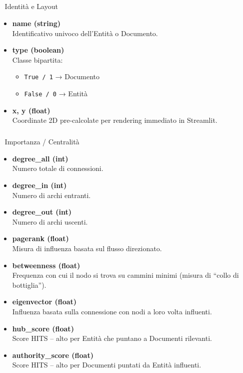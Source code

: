 \documentclass[
  italian,
  a4paper,
]{article}
\makeatletter
\let\oldsubparagraph\subparagraph
\renewcommand{\subparagraph}{
    \@ifstar
      \xxxSubParagraphStar
      \xxxSubParagraphNoStar
  }
\newcommand{\xxxSubParagraphStar}[1]{\oldsubparagraph*{#1}\mbox{}}
\newcommand{\xxxSubParagraphNoStar}[1]{\oldsubparagraph{#1}\mbox{}}
\providecommand{\tightlist}{%
  \setlength{\itemsep}{0pt}\setlength{\parskip}{0pt}}
\makeatother
\begin{document}
\subparagraph{🔹 Identità e Layout}\label{identituxe0-e-layout}

\begin{itemize}
\item
  \textbf{name (string)}\\
  Identificativo univoco dell'Entità o Documento.
\item
  \textbf{type (boolean)}\\
  Classe bipartita:

  \begin{itemize}
  \tightlist
  \item
    \texttt{True\ /\ 1} → Documento\\
  \item
    \texttt{False\ /\ 0} → Entità
  \end{itemize}
\item
  \textbf{x, y (float)}\\
  Coordinate 2D pre-calcolate per rendering immediato in Streamlit.
\end{itemize}

\subparagraph{🔹 Importanza /
Centralità}\label{importanza-centralituxe0}

\begin{itemize}
\item
  \textbf{degree\_all (int)}\\
  Numero totale di connessioni.
\item
  \textbf{degree\_in (int)}\\
  Numero di archi entranti.
\item
  \textbf{degree\_out (int)}\\
  Numero di archi uscenti.
\item
  \textbf{pagerank (float)}\\
  Misura di influenza basata sul flusso direzionato.
\item
  \textbf{betweenness (float)}\\
  Frequenza con cui il nodo si trova su cammini minimi (misura di
  ``collo di bottiglia'').
\item
  \textbf{eigenvector (float)}\\
  Influenza basata sulla connessione con nodi a loro volta influenti.
\item
  \textbf{hub\_score (float)}\\
  Score HITS -- alto per Entità che puntano a Documenti rilevanti.
\item
  \textbf{authority\_score (float)}\\
  Score HITS -- alto per Documenti puntati da Entità influenti.
\end{itemize}
\end{document}
